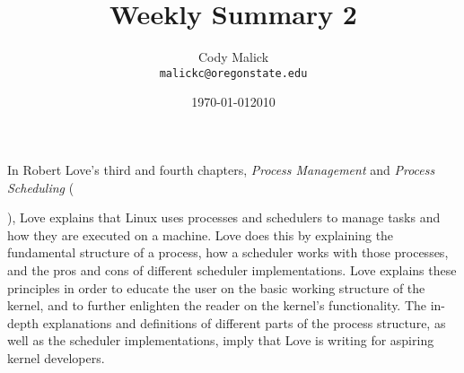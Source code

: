 \documentclass[10pt,letterpaper]{article}
\begin{document}
  \title{Weekly Summary 2}
  \author{Cody Malick\\
  \texttt{malickc@oregonstate.edu}}
  \date{\today}
  \maketitle

    In Robert Love's third and fourth chapters, \textit{Process Management}
    and \textit{Process Scheduling} (\date{2010}), Love explains that Linux uses
    processes and schedulers to manage tasks and how they are executed on a
    machine. Love does this by explaining the fundamental structure of a process,
    how a scheduler works with those processes, and the pros and cons of
    different scheduler implementations. Love explains these principles in order
    to educate the user on the basic working structure of the kernel, and
    to further enlighten the reader on the kernel's functionality. The in-depth
    explanations and definitions of different parts of the process structure,
    as well as the scheduler implementations, imply that Love is writing for
    aspiring kernel developers.
\end{document}
